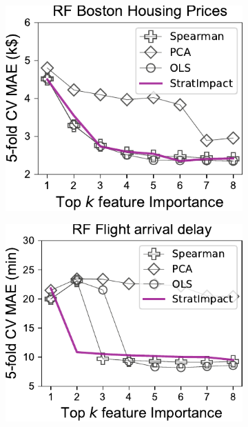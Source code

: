 \documentclass[twoside,11pt]{article}
\begin{document}
\begin{figure}
\centering
\begin{subfigure}{.24\textwidth}
    \centering
\includegraphics[scale=0.51]{images/boston-topk-baseline-Importance.pdf}
\end{subfigure}%
\hfill
\begin{subfigure}{.24\textwidth}
    \centering
\includegraphics[scale=0.53]{images/flights-topk-baseline-Importance.pdf}
\end{subfigure}
\hfill
\begin{subfigure}{.24\textwidth}

\end{subfigure}
\end{figure}
\end{document}
